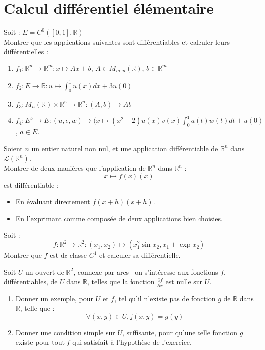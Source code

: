 \section{Calcul diff\'erentiel \'el\'ementaire}

\begin{exer}
Soit : $E = C^0([0,1],\mathbb{R})$\\
Montrer que les applications suivantes sont différentiables et calculer leurs différentielles :
\begin{enumerate}
\item $f_1 : \mathbb{R}^n \rightarrow \mathbb{R}^m : x \mapsto Ax + b$, $A \in M_{m,n}(\mathbb{R})$, $b \in \mathbb{R}^m$
\item $f_2 : E \rightarrow \mathbb{R} : u \mapsto \int_{0}^1 u(x) dx + 3u(0)$
\item $f_3 : M_n(\mathbb{R}) \times \mathbb{R}^n \rightarrow \mathbb{R}^n : (A,b) \mapsto Ab$
\item $f_4 : E^3 \rightarrow E : (u,v,w) \mapsto (x \mapsto (x^2 + 2)u(x)v(x)\int_{0}^1 a(t)w(t)dt + u(0)$, $a \in E$.
\end{enumerate}
\end{exer}

\begin{exer}
Soient $n$ un entier naturel non nul, et une application diff\'erentiable de $\mathbb{R}^n$ dans $\mathcal{L}(\mathbb{R}^n)$.\\
Montrer de deux mani\`eres que l'application de $\mathbb{R}^n$ dans $\mathbb{R}^n$ :
\[x\mapsto f(x)(x)\]
est diff\'erentiable :
\begin{itemize}
\item En évaluant directement $f(x+h)(x+h)$.
\item En l'exprimant comme composée de deux applications bien choisies.
\end{itemize}
\end{exer}

\begin{exer}
Soit :\[f : \mathbb{R}^2 \rightarrow \mathbb{R}^2 : (x_1,x_2) \mapsto (x_1^2 \sin x_2 , x_1 + \exp x_2)\]
Montrer que $f$ est de classe $C^1$ et calculer sa différentielle.
\end{exer}

\begin{exer}
Soit $U$ un ouvert de $\mathbb{R}^2$, connexe par arcs : %
on s'int\'eresse aux fonctions $f$, diff\'erentiables, de $U$ dans $\mathbb{R}$, telles que la fonction $\frac{\partial{f}}{\partial{x}}$ est nulle sur $U$.
\begin{enumerate}
\item Donner un exemple, pour $U$ et $f$, tel qu'il n'existe pas de fonction $g$ de $\mathbb{R}$ dans $\mathbb{R}$, telle que :
\[\forall (x,y)\in U , f(x,y)=g(y)\]
\item Donner une condition simple sur $U$, suffisante, pour qu'une telle fonction $g$ existe pour tout $f$ qui satisfait \`a l'hypoth\`ese de l'exercice.
\end{enumerate}
\end{exer}

